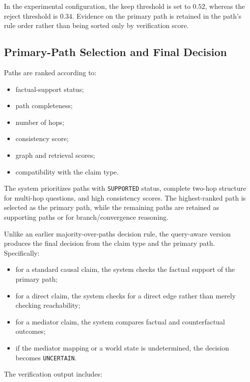 In the experimental configuration, the keep threshold is set to \(0.52\),
whereas the reject threshold is \(0.34\). Evidence on the primary path is
retained in the path's rule order rather than being sorted only by
verification score.

\subsection{Primary-Path Selection and Final Decision}

Paths are ranked according to:

\begin{itemize}
    \item factual-support status;
    \item path completeness;
    \item number of hops;
    \item consistency score;
    \item graph and retrieval scores;
    \item compatibility with the claim type.
\end{itemize}

The system prioritizes paths with \texttt{SUPPORTED} status, complete two-hop
structure for multi-hop questions, and high consistency scores. The
highest-ranked path is selected as the primary path, while the remaining
paths are retained as supporting paths or for branch/convergence reasoning.

Unlike an earlier majority-over-paths decision rule, the query-aware version
produces the final decision from the claim type and the primary path.
Specifically:

\begin{itemize}
    \item for a standard causal claim, the system checks the factual support
    of the primary path;

    \item for a direct claim, the system checks for a direct edge rather than
    merely checking reachability;

    \item for a mediator claim, the system compares factual and
    counterfactual outcomes;

    \item if the mediator mapping or a world state is undetermined, the
    decision becomes \texttt{UNCERTAIN}.
\end{itemize}

The verification output includes:

